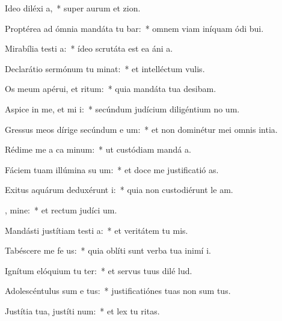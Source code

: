 \item Ideo diléxi  a,~* super aurum et zion.
\item Proptérea ad ómnia mandáta tu bar:~* omnem viam iníquam ódi bui.
\item Mirabília testi a:~* ídeo scrutáta est ea áni a.
\item Declarátio sermónum tu minat:~* et intelléctum  vulis.
\item Os meum apérui, et  ritum:~* quia mandáta tua desibam.
\item Aspice in me, et mi i:~* secúndum judícium diligéntium no um.
\item Gressus meos dírige secúndum e um:~* et non dominétur mei omnis intia.
\item Rédime me a ca minum:~* ut custódiam mandá a.
\item Fáciem tuam illúmina su  um:~* et doce me justificatió as.
\item Exitus aquárum deduxérunt  i:~* quia non custodiérunt le am.
\item {} , mine:~* et rectum judíci um.
\item Mandásti justítiam testi a:~* et veritátem tu mis.
\item Tabéscere me fe  us:~* quia oblíti sunt verba tua inimí i.
\item Ignítum elóquium tu ter:~* et servus tuus dilé lud.
\item Adolescéntulus sum e  tus:~* justificatiónes tuas non sum tus.
\item Justítia tua, justíti  num:~* et lex tu ritas.
